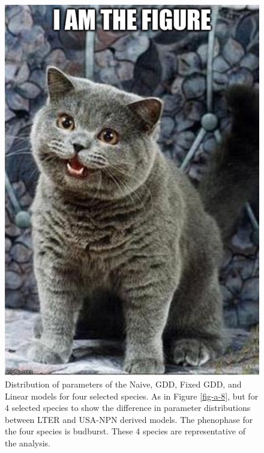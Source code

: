\begin{figure}
	\centering
	\includegraphics[scale=0.5]{images/figure_filler.jpg}
	\caption[Distribution of parameters of the Naive, GDD, Fixed GDD, and Linear models for four selected species]{Distribution of parameters of the Naive, GDD, Fixed GDD, and Linear models for four selected species. As in Figure \ref{fig-a-8}, but for 4 selected species to show the difference in parameter distributions between LTER and USA-NPN derived models. The phenophase for the four species is budburst. These 4 species are representative of the analysis.} \label{fig-a-10}
\end{figure}

\newpage

